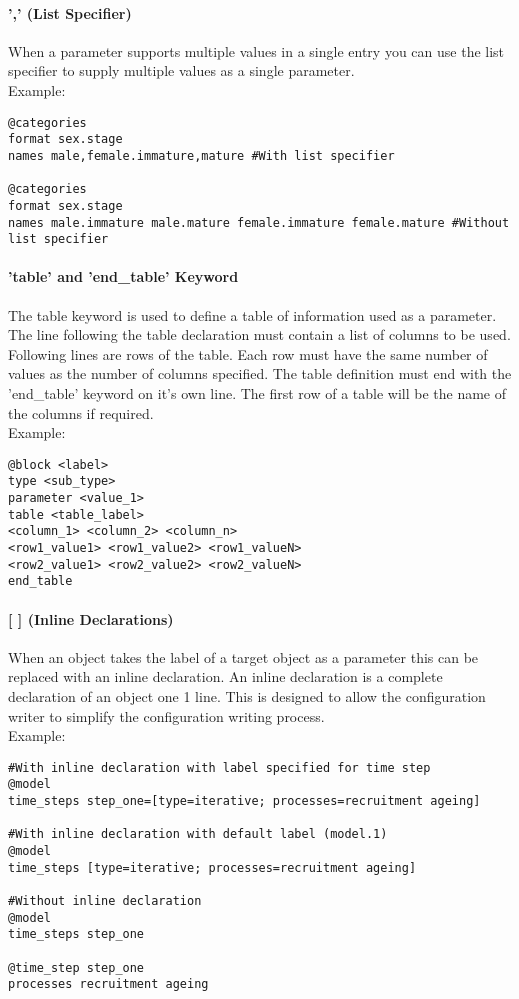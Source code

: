 \paragraph*{',' (List Specifier)}
When a parameter supports multiple values in a single entry you can use the list specifier to supply multiple values as a single parameter.\\
Example:
{\small{\begin{verbatim}
@categories
format sex.stage
names male,female.immature,mature #With list specifier

@categories
format sex.stage
names male.immature male.mature female.immature female.mature #Without list specifier
\end{verbatim}}}

\paragraph*{'table' and 'end\_table' Keyword}
The table keyword is used to define a table of information used as a parameter. The line following the table declaration must contain a list of columns to be used. Following lines are rows of the table. Each row must have the same number of values as the number of columns specified.
The table definition must end with the 'end\_table' keyword on it's own line.
The first row of a table will be the name of the columns if required.\\
Example:
{\small{\begin{verbatim}
@block <label>
type <sub_type>
parameter <value_1>
table <table_label>
<column_1> <column_2> <column_n>
<row1_value1> <row1_value2> <row1_valueN>
<row2_value1> <row2_value2> <row2_valueN>
end_table
\end{verbatim}}}

\paragraph*{[ ] (Inline Declarations)}
When an object takes the label of a target object as a parameter this can be replaced with an inline declaration. An inline declaration is a complete declaration of an object one 1 line. This is designed to allow the configuration writer to simplify the configuration writing process.\\
Example:
{\small{\begin{verbatim}
#With inline declaration with label specified for time step
@model
time_steps step_one=[type=iterative; processes=recruitment ageing]

#With inline declaration with default label (model.1)
@model
time_steps [type=iterative; processes=recruitment ageing]

#Without inline declaration
@model
time_steps step_one

@time_step step_one
processes recruitment ageing
\end{verbatim}}}

